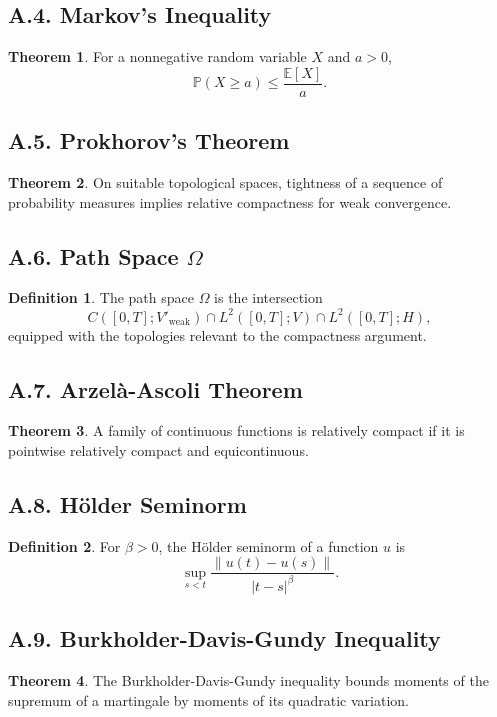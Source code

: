 \documentclass[11pt]{article}
\theoremstyle{definition}
\newtheorem{definition}{Definition}
\newtheorem{theorem}{Theorem}
\theoremstyle{remark}
\begin{document}
\subsection*{A.4. Markov's Inequality}
\begin{theorem}
For a nonnegative random variable \(X\) and \(a>0\),
\[
\mathbb P(X\ge a)\le \frac{\mathbb E[X]}{a}.
\]
\end{theorem}

\subsection*{A.5. Prokhorov's Theorem}
\begin{theorem}
On suitable topological spaces, tightness of a sequence of probability measures implies relative compactness for weak convergence.
\end{theorem}

\subsection*{A.6. Path Space \(\Omega\)}
\begin{definition}
The path space \(\Omega\) is the intersection
\[
C([0,T];V'_{\mathrm{weak}})
\cap
L^2([0,T];V)
\cap
L^2([0,T];H),
\]
equipped with the topologies relevant to the compactness argument.
\end{definition}

\subsection*{A.7. Arzelà-Ascoli Theorem}
\begin{theorem}
A family of continuous functions is relatively compact if it is pointwise relatively compact and equicontinuous.
\end{theorem}

\subsection*{A.8. Hölder Seminorm}
\begin{definition}
For \(\beta>0\), the Hölder seminorm of a function \(u\) is
\[
\sup_{s<t}\frac{\|u(t)-u(s)\|}{|t-s|^\beta}.
\]
\end{definition}

\subsection*{A.9. Burkholder-Davis-Gundy Inequality}
\begin{theorem}
The Burkholder-Davis-Gundy inequality bounds moments of the supremum of a martingale by moments of its quadratic variation.
\end{theorem}
\end{document}
